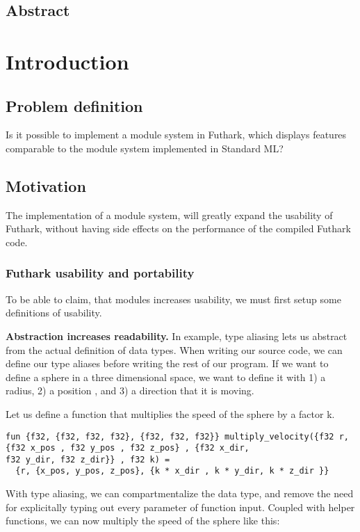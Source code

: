 \subsection{Abstract}
\label{subsec:abstract}


\section{Introduction}
\label{sec:introduction}


\subsection{Problem definition}
\label{subsec:probdef}
Is it possible to implement a module system in Futhark, which displays features
comparable to the module system implemented in Standard ML? \cite{sml modules}

\subsection{Motivation}
\label{subsec:label}
The implementation of a module system, will greatly expand the usability of
Futhark, without having side effects on the performance of the compiled Futhark code.
\subsubsection{Futhark usability and portability}
\label{subsec:usability}
To be able to claim, that modules increases usability, we must first
setup some definitions of usability.

\textbf{Abstraction increases readability.} In example, type aliasing lets us abstract
from the actual definition of data types.
When writing our source code, we can define our type aliases before writing the
rest of our program.
If we want to define a sphere in a three dimensional space, we want to define it
with 1) a radius, 2) a position , and 3) a direction that it is
moving. 

Let us define a function that multiplies the speed of the sphere by a factor k.
\begin{verbatim}
fun {f32, {f32, f32, f32}, {f32, f32, f32}} multiply_velocity({f32 r, {f32 x_pos , f32 y_pos , f32 z_pos} , {f32 x_dir,
f32 y_dir, f32 z_dir}} , f32 k) =
  {r, {x_pos, y_pos, z_pos}, {k * x_dir , k * y_dir, k * z_dir }}
\end{verbatim}

With type aliasing, we can compartmentalize the data type, and remove the need
for explicitally typing out every parameter of function input.
Coupled with helper functions, we can now multiply the speed of the sphere like
this:

